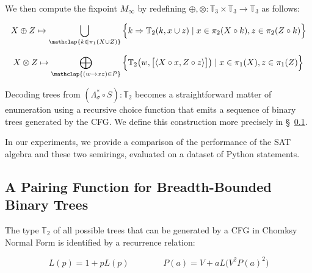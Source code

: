 \documentclass[runningheads]{llncs}
\begin{document}
\noindent We then compute the fixpoint $M_\infty$ by redefining $\oplus, \otimes: \mathbb{T}_3 \times \mathbb{T}_3 \rightarrow \mathbb{T}_3$ as follows:

\begin{equation}
  X \oplus Z \mapsto \bigcup_{\mathclap{k\in \pi_1(X \cup Z)}}\Big\{k \Rightarrow \mathbb{T}_2(k, x \cup z) \mid x \in \pi_2(X\circ k), z \in \pi_2(Z\circ k)\Big\}
\end{equation}

\begin{equation}
  X \otimes Z \mapsto \bigoplus_{\mathclap{(w\rightarrow xz) \in P}}\Big\{\mathbb{T}_2\big(w, \big[\langle X\circ x, Z\circ z\rangle\big]\big) \mid x \in \pi_1(X), z \in \pi_1(Z)\Big\}
\end{equation}

Decoding trees from $(\Lambda_\sigma^* \circ S): \mathbb{T}_2$ becomes a straightforward matter of enumeration using a recursive choice function that emits a sequence of binary trees generated by the CFG. We define this construction more precisely in \S~\ref{sec:pairing}.


In our experiments, we provide a comparison of the performance of the SAT algebra and these two semirings, evaluated on a dataset of Python statements.

\pagebreak\subsection{A Pairing Function for Breadth-Bounded Binary Trees}\label{sec:pairing}

The type $\mathbb{T}_2$ of all possible trees that can be generated by a CFG in Chomksy Normal Form is identified by a recurrence relation:

\begin{equation}
  L(p) = 1 + p L(p) \phantom{addspace} P(a) = V + a L\big(V^2P(a)^2\big)
\end{equation}
\end{document}
